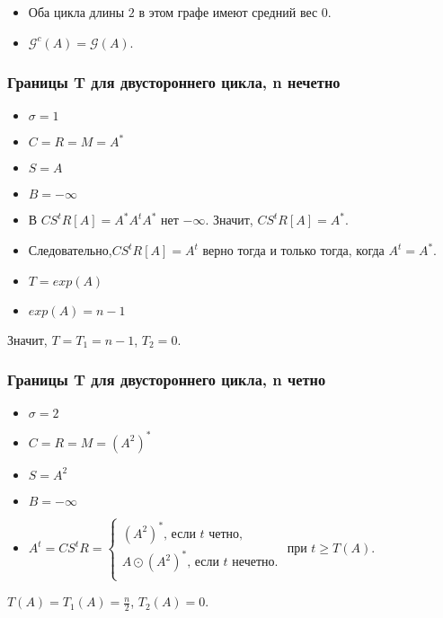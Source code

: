 \documentclass{beamer}
\begin{document}
\begin{frame}
\begin{center}
\end{center}
\begin{itemize}
\item Оба цикла длины $2$ в этом графе имеют средний вес $0$.
\item $\mathcal{G}^c(A) = \mathcal{G}(A)$.
\end{itemize}
\end{frame}


\begin{frame}
\frametitle{Границы T для двустороннего цикла, n нечетно}
\begin{itemize}
\item $\sigma = 1$
\item $C = R = M = A^*$
\item $S = A$
\item $B = -\infty$
\item В $CS^tR[A] = A^*A^tA^*$ нет $-\infty$. Значит, $CS^tR[A] = A^*$.
\item Следовательно,$CS^tR[A] = A^t$ верно тогда и только тогда, когда $A^t = A^*$.
\item $T = exp(A)$
\item $exp(A) = n - 1$
\end{itemize}
Значит, $T = T_1 = n - 1$, $T_2 = 0$.
\end{frame}


\begin{frame}
\frametitle{Границы T для двустороннего цикла, n четно}
\begin{itemize}
\item $\sigma = 2$
\item $C = R = M = (A^2)^*$
\item $S = A^2$
\item $B = -\infty$
\item $A^t = CS^tR = \begin{cases}
(A^2)^* \text{, если } t \text{ четно,}\\
A \odot (A^2)^*\text{, если } t \text{ нечетно.}\\
\end{cases}$ при $t \ge T(A)$.
\end{itemize}
$T(A) = T_1(A) = \frac{n}{2}$, $T_2(A) = 0$.
\end{frame}
\end{document}

